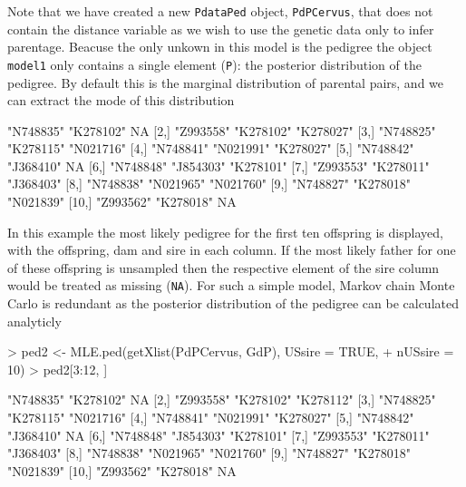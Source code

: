 \documentclass{article}
\begin{document}
Note that we have created a new \texttt{PdataPed} object, \texttt{PdPCervus}, that does not contain the distance variable as we wish to use the genetic data only to infer parentage.  Beacuse the only unkown in this model is the pedigree the object \texttt{model1} only contains a single element (\texttt{P}): the posterior distribution of the pedigree.  By default this is the marginal distribution of parental pairs, and we can extract the mode of this distribution

\begin{Schunk}
\begin{Soutput}
      [,1]      [,2]      [,3]     
 [1,] "N748835" "K278102" NA       
 [2,] "Z993558" "K278102" "K278027"
 [3,] "N748825" "K278115" "N021716"
 [4,] "N748841" "N021991" "K278027"
 [5,] "N748842" "J368410" NA       
 [6,] "N748848" "J854303" "K278101"
 [7,] "Z993553" "K278011" "J368403"
 [8,] "N748838" "N021965" "N021760"
 [9,] "N748827" "K278018" "N021839"
[10,] "Z993562" "K278018" NA       
\end{Soutput}
\end{Schunk}

In this example the most likely pedigree for the first ten offspring is displayed, with the offspring, dam and sire in each column.  If the most likely father for one of these offspring is unsampled then the respective element of the sire column would be treated as missing (\texttt{NA}). For such a simple model, Markov chain Monte Carlo is redundant as the posterior distribution of the pedigree can be calculated analyticly

\begin{Schunk}
\begin{Sinput}
> ped2 <- MLE.ped(getXlist(PdPCervus, GdP), USsire = TRUE, 
+     nUSsire = 10)
> ped2[3:12, ]
\end{Sinput}
\begin{Soutput}
      [,1]      [,2]      [,3]     
 [1,] "N748835" "K278102" NA       
 [2,] "Z993558" "K278102" "K278112"
 [3,] "N748825" "K278115" "N021716"
 [4,] "N748841" "N021991" "K278027"
 [5,] "N748842" "J368410" NA       
 [6,] "N748848" "J854303" "K278101"
 [7,] "Z993553" "K278011" "J368403"
 [8,] "N748838" "N021965" "N021760"
 [9,] "N748827" "K278018" "N021839"
[10,] "Z993562" "K278018" NA       
\end{Soutput}
\end{Schunk}
\end{document}
